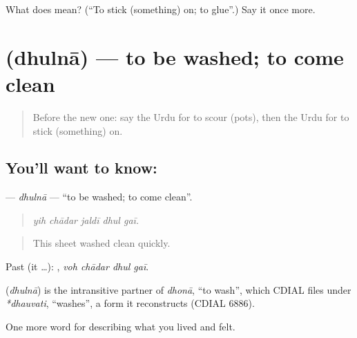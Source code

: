 \begin{tcolorbox}[breakable,colback=teal!4,colframe=teal!35!black,title={Before you move on}]
What does  mean? (\textquotedblleft{}To stick (something) on; to glue\textquotedblright{}.) Say it once more.
\end{tcolorbox}
\section[\texorpdfstring{\ur{دھلنا} (dhulnā)}{دھلنا (dhulnā)}]{ (dhulnā) — to be washed; to come clean}

\label{lesson:UR-C506-dhulna}



\begin{quote}
Before the new one: say the Urdu for to scour (pots), then the Urdu for to stick (something) on.
\end{quote}

\subsection*{You'll want to know: }
\textbf{} — \emph{dhulnā} — \textquotedblleft{}to be washed; to come clean\textquotedblright{}.

\begin{quote}
    
\end{quote}

\begin{quote}
\emph{yih chādar jaldī dhul gaī.}
\end{quote}

\begin{quote}
This sheet washed clean quickly.
\end{quote}

Past (it …):    , \emph{voh chādar dhul gaī}.

\begin{cousinweb}
\textbf{} (\emph{dhulnā}) is the intransitive partner of \emph{dhonā}, \textquotedblleft{}to wash\textquotedblright{}, which CDIAL files under \emph{*dhauvati}, \textquotedblleft{}washes\textquotedblright{}, a form it reconstructs (CDIAL 6886).
\end{cousinweb}

\begin{grammarlens}[title={What you've built}]
One more word for describing what you lived and felt.
\end{grammarlens}

